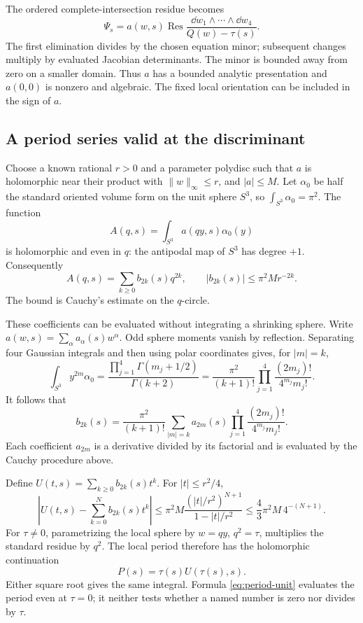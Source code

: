 The ordered complete-intersection residue becomes
\begin{equation}\label{eq:local-residue}
 \Psi_s=a(w,s)\operatorname{Res}
   \frac{\dd w_1\wedge\cdots\wedge\dd w_4}{Q(w)-\tau(s)}.
\end{equation}
The first elimination divides by the chosen equation minor; subsequent
changes multiply by evaluated Jacobian determinants. The minor is
bounded away from zero on a smaller domain. Thus $a$ has a bounded
analytic presentation and $a(0,0)$ is nonzero and algebraic. The
fixed local orientation can be included in the sign of $a$.

\subsection{A period series valid at the discriminant}

Choose a known rational $r>0$ and a parameter polydisc such that
$a$ is holomorphic near their product with $\|w\|_\infty\le r$,
and $|a|\le M$. Let $\alpha_0$ be half the standard oriented
volume form on the unit sphere $S^3$, so $\int_{S^3}\alpha_0=\pi^2$.
The function
\[
 A(q,s)=\int_{S^3}a(qy,s)\alpha_0(y)
\]
is holomorphic and even in $q$: the antipodal map of $S^3$ has
degree $+1$. Consequently
\begin{equation}\label{eq:even-period-series}
 A(q,s)=\sum_{k\ge0}b_{2k}(s)q^{2k},
 \qquad |b_{2k}(s)|\le\pi^2Mr^{-2k}.
\end{equation}
The bound is Cauchy's estimate on the $q$-circle.

These coefficients can be evaluated without integrating a shrinking
sphere. Write $a(w,s)=\sum_\alpha a_\alpha(s)w^\alpha$.
Odd sphere moments vanish by reflection. Separating four Gaussian
integrals and then using polar coordinates gives, for $|m|=k$,
\[
 \int_{S^3}y^{2m}\alpha_0
 =\frac{\prod_{j=1}^4\Gamma(m_j+1/2)}{\Gamma(k+2)}
 =\frac{\pi^2}{(k+1)!}
       \prod_{j=1}^4\frac{(2m_j)!}{4^{m_j}m_j!}.
\]
It follows that
\begin{equation}\label{eq:period-moments}
 b_{2k}(s)=\frac{\pi^2}{(k+1)!}
   \sum_{|m|=k}a_{2m}(s)
           \prod_{j=1}^4\frac{(2m_j)!}{4^{m_j}m_j!}.
\end{equation}
Each coefficient $a_{2m}$ is a derivative divided by its factorial
and is evaluated by the Cauchy procedure above.

Define $U(t,s)=\sum_{k\ge0}b_{2k}(s)t^k$. For $|t|\le r^2/4$,
\begin{equation}\label{eq:unit-series-tail}
 \left|U(t,s)-\sum_{k=0}^Nb_{2k}(s)t^k\right|
 \le\pi^2M\frac{(|t|/r^2)^{N+1}}{1-|t|/r^2}
 \le\frac43\pi^2M\,4^{-(N+1)}.
\end{equation}
For $\tau\ne0$, parametrizing the local sphere by $w=qy$,
$q^2=\tau$, multiplies the standard residue by $q^2$.
The local period therefore has the holomorphic continuation
\begin{equation}\label{eq:period-unit}
                       P(s)=\tau(s)U(\tau(s),s).
\end{equation}
Either square root gives the same integral. Formula
\eqref{eq:period-unit} evaluates the period even at $\tau=0$;
it neither tests whether a named number is zero nor divides by $\tau$.

